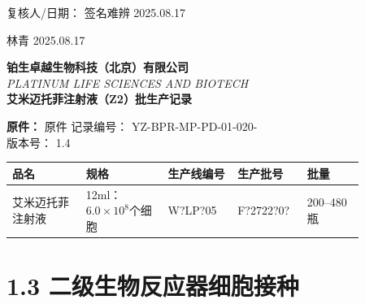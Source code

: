 \documentclass[UTF8,10pt,a4paper,fontset=fandol]{ctexart}
\newcommand{\fieldvalue}[1]{#1}
\newcommand{\handwritten}[1]{#1}
\begin{document}
\medskip

\noindent
复核人/日期：
\fieldvalue{\handwritten{签名难辨}}
\quad
\fieldvalue{\handwritten{2025.08.17}}

\medskip

\handwritten{林青}
\quad
\handwritten{2025.08.17}

\newpage

\begin{center}
\textbf{铂生卓越生物科技（北京）有限公司}\\
\textit{PLATINUM LIFE SCIENCES AND BIOTECH}\\[2mm]
\textbf{艾米迈托菲注射液（Z2）批生产记录}
\end{center}

\noindent
\textbf{原件：}
\fieldvalue{原件}
\hfill
记录编号：
\fieldvalue{YZ-BPR-MP-PD-01-020-}
\\
\hfill
版本号：
\fieldvalue{1.4}

\begin{center}
\begin{tabular}{|p{0.18\linewidth}|p{0.20\linewidth}|p{0.17\linewidth}|p{0.17\linewidth}|p{0.14\linewidth}|}
\hline
品名 & 规格 & 生产线编号 & 生产批号 & 批量\\
\hline
\fieldvalue{艾米迈托菲注射液}
&
\fieldvalue{12ml：$6.0\times10^{8}$个细胞}
&
\fieldvalue{\handwritten{W?LP?05}}
&
\fieldvalue{\handwritten{F?2722?0?}}
&
\fieldvalue{200--480 瓶}
\\
\hline
\end{tabular}
\end{center}

\section*{1.3 二级生物反应器细胞接种}
\end{document}
